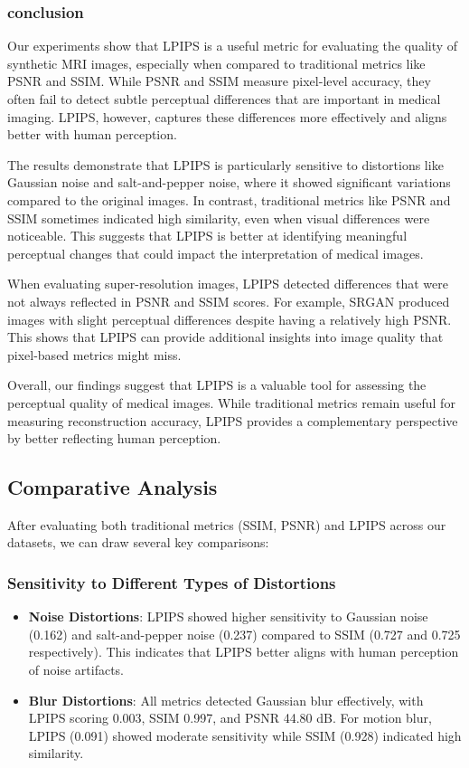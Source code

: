 \documentclass[a4paper,12pt]{article}
\begin{document}
\subsubsection{conclusion}
Our experiments show that LPIPS is a useful metric for evaluating the quality of synthetic MRI images, especially when compared to traditional metrics like PSNR and SSIM. While PSNR and SSIM measure pixel-level accuracy, they often fail to detect subtle perceptual differences that are important in medical imaging. LPIPS, however, captures these differences more effectively and aligns better with human perception.

The results demonstrate that LPIPS is particularly sensitive to distortions like Gaussian noise and salt-and-pepper noise, where it showed significant variations compared to the original images. In contrast, traditional metrics like PSNR and SSIM sometimes indicated high similarity, even when visual differences were noticeable. This suggests that LPIPS is better at identifying meaningful perceptual changes that could impact the interpretation of medical images.

When evaluating super-resolution images, LPIPS detected differences that were not always reflected in PSNR and SSIM scores. For example, SRGAN produced images with slight perceptual differences despite having a relatively high PSNR. This shows that LPIPS can provide additional insights into image quality that pixel-based metrics might miss.

Overall, our findings suggest that LPIPS is a valuable tool for assessing the perceptual quality of medical images. While traditional metrics remain useful for measuring reconstruction accuracy, LPIPS provides a complementary perspective by better reflecting human perception.

\subsection{Comparative Analysis}
After evaluating both traditional metrics (SSIM, PSNR) and LPIPS across our datasets, we can draw several key comparisons:

\subsubsection{Sensitivity to Different Types of Distortions}
\begin{itemize}
    \item \textbf{Noise Distortions}: LPIPS showed higher sensitivity to Gaussian noise (0.162) and salt-and-pepper noise (0.237) compared to SSIM (0.727 and 0.725 respectively). This indicates that LPIPS better aligns with human perception of noise artifacts.
    
    \item \textbf{Blur Distortions}: All metrics detected Gaussian blur effectively, with LPIPS scoring 0.003, SSIM 0.997, and PSNR 44.80 dB. For motion blur, LPIPS (0.091) showed moderate sensitivity while SSIM (0.928) indicated high similarity.
\end{itemize}
\end{document}
